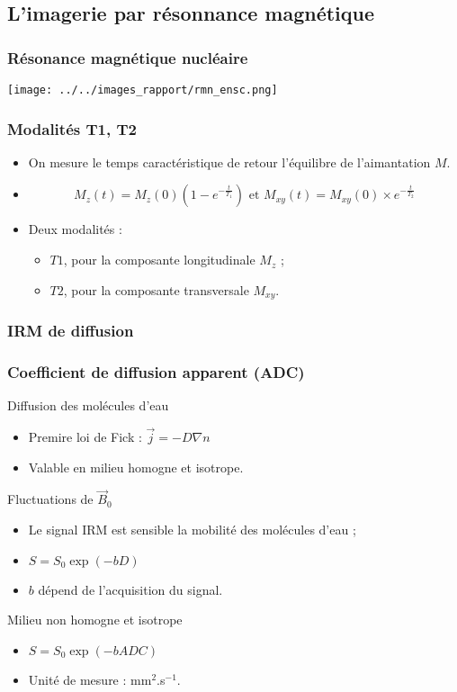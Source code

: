 \subsection{L'imagerie par r\'esonnance magn\'etique}



\begin{frame}
\frametitle{R\'esonance magn\'etique nucl\'eaire}
\texttt{[image: ../../images\_rapport/rmn\_ensc.png]}
\end{frame}

\begin{frame}
\frametitle{Modalit\'es T1, T2}
\begin{itemize}
\item<+-> On mesure le temps caract\'eristique de retour  l'\'equilibre de l'aimantation $M$.
\item<+-> \[M_z(t)=M_z(0)\left(1-e^{-\frac{t}{T_1}}\right)\text{ et }M_{xy}(t)=M_{xy}(0)\times e^{-\frac{t}{T_2}}\]
\item<+-> Deux modalit\'es :
\begin{itemize}
\item<+-> $T1$, pour la composante longitudinale $M_z$ ;
\item<+-> $T2$, pour la composante transversale $M_{xy}$.
\end{itemize}
\end{itemize}
\end{frame}

\subsubsection{IRM de diffusion}
\begin{frame}
\frametitle{Coefficient de diffusion apparent (ADC)}
\begin{block}{Diffusion des mol\'ecules d'eau}
\begin{itemize}
\item Premire loi de Fick : $\vec{j}=-D\nabla n$
\item Valable en milieu homogne et isotrope.
\end{itemize}
\end{block}

\pause
\begin{block}{Fluctuations de $\vec{B}_0$}%
\begin{itemize}
\item Le signal IRM est sensible  la mobilit\'e des mol\'ecules d'eau ;
\item $S=S_0\exp\left(-bD\right)$
\item $b$ d\'epend de l'acquisition du signal.
\end{itemize}
\end{block}

\pause
\begin{block}{Milieu non homogne et isotrope}%
\begin{itemize}
\item $S=S_0\exp\left(-bADC\right)$
\item Unit\'e de mesure : mm${}^2$.s${}^{-1}$.
\end{itemize}
\end{block}
\end{frame}

